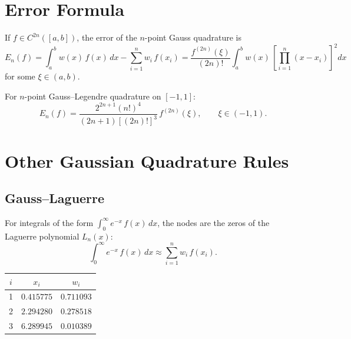 \section{Error Formula}

\begin{theorem}
\label{thm:gauss-error}
If $f \in C^{2n}([a,b])$, the error of the $n$-point Gauss quadrature is
\[
    E_n(f) = \int_a^b w(x)\,f(x)\,dx - \sum_{i=1}^{n} w_i\,f(x_i) = \frac{f^{(2n)}(\xi)}{(2n)!}\int_a^b w(x)\,\left[\prod_{i=1}^{n}(x-x_i)\right]^2 dx
\]
for some $\xi \in (a,b)$.
\end{theorem}

\begin{corollary}
For $n$-point Gauss--Legendre quadrature on $[-1,1]$:
\[
    E_n(f) = \frac{2^{2n+1}(n!)^4}{(2n+1)[(2n)!]^3}\,f^{(2n)}(\xi), \qquad \xi \in (-1,1).
\]
\end{corollary}

\section{Other Gaussian Quadrature Rules}

\subsection{Gauss--Laguerre}

\begin{definition}
\label{def:gauss-laguerre}
For integrals of the form $\int_0^\infty e^{-x}\,f(x)\,dx$, the nodes are the zeros of the Laguerre polynomial $L_n(x)$:
\[
    \int_0^\infty e^{-x}\,f(x)\,dx \approx \sum_{i=1}^{n} w_i\,f(x_i).
\]
\end{definition}

\begin{example}[Gauss--Laguerre nodes and weights ($n=3$)]
\begin{center}
\begin{tabular}{ccc}
    \toprule
    $i$ & $x_i$ & $w_i$ \\
    \midrule
    1 & $0.415775$ & $0.711093$ \\
    2 & $2.294280$ & $0.278518$ \\
    3 & $6.289945$ & $0.010389$ \\
    \bottomrule
\end{tabular}
\end{center}
\end{example}

